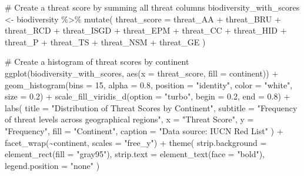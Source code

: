 \documentclass[
  letterpaper,
]{book}
\newenvironment{Shaded}{\begin{snugshade}}{\end{snugshade}}
\newcommand{\AttributeTok}[1]{\textcolor[rgb]{0.40,0.45,0.13}{#1}}
\newcommand{\CommentTok}[1]{\textcolor[rgb]{0.37,0.37,0.37}{#1}}
\newcommand{\DecValTok}[1]{\textcolor[rgb]{0.68,0.00,0.00}{#1}}
\newcommand{\FloatTok}[1]{\textcolor[rgb]{0.68,0.00,0.00}{#1}}
\newcommand{\FunctionTok}[1]{\textcolor[rgb]{0.28,0.35,0.67}{#1}}
\newcommand{\NormalTok}[1]{\textcolor[rgb]{0.00,0.23,0.31}{#1}}
\newcommand{\OtherTok}[1]{\textcolor[rgb]{0.00,0.23,0.31}{#1}}
\newcommand{\SpecialCharTok}[1]{\textcolor[rgb]{0.37,0.37,0.37}{#1}}
\newcommand{\StringTok}[1]{\textcolor[rgb]{0.13,0.47,0.30}{#1}}
\begin{document}
\begin{Shaded}
\begin{Highlighting}[]
\CommentTok{\# Create a threat score by summing all threat columns}
\NormalTok{biodiversity\_with\_scores }\OtherTok{\textless{}{-}}\NormalTok{ biodiversity }\SpecialCharTok{\%\textgreater{}\%}
  \FunctionTok{mutate}\NormalTok{(}
    \AttributeTok{threat\_score =}\NormalTok{ threat\_AA }\SpecialCharTok{+}\NormalTok{ threat\_BRU }\SpecialCharTok{+}\NormalTok{ threat\_RCD }\SpecialCharTok{+} 
\NormalTok{                  threat\_ISGD }\SpecialCharTok{+}\NormalTok{ threat\_EPM }\SpecialCharTok{+}\NormalTok{ threat\_CC }\SpecialCharTok{+} 
\NormalTok{                  threat\_HID }\SpecialCharTok{+}\NormalTok{ threat\_P }\SpecialCharTok{+}\NormalTok{ threat\_TS }\SpecialCharTok{+} 
\NormalTok{                  threat\_NSM }\SpecialCharTok{+}\NormalTok{ threat\_GE}
\NormalTok{  )}

\CommentTok{\# Create a histogram of threat scores by continent}
\FunctionTok{ggplot}\NormalTok{(biodiversity\_with\_scores, }\FunctionTok{aes}\NormalTok{(}\AttributeTok{x =}\NormalTok{ threat\_score, }\AttributeTok{fill =}\NormalTok{ continent)) }\SpecialCharTok{+}
  \FunctionTok{geom\_histogram}\NormalTok{(}\AttributeTok{bins =} \DecValTok{15}\NormalTok{, }\AttributeTok{alpha =} \FloatTok{0.8}\NormalTok{, }\AttributeTok{position =} \StringTok{"identity"}\NormalTok{, }\AttributeTok{color =} \StringTok{"white"}\NormalTok{, }\AttributeTok{size =} \FloatTok{0.2}\NormalTok{) }\SpecialCharTok{+}
  \FunctionTok{scale\_fill\_viridis\_d}\NormalTok{(}\AttributeTok{option =} \StringTok{"turbo"}\NormalTok{, }\AttributeTok{begin =} \FloatTok{0.2}\NormalTok{, }\AttributeTok{end =} \FloatTok{0.8}\NormalTok{) }\SpecialCharTok{+}
  \FunctionTok{labs}\NormalTok{(}
    \AttributeTok{title =} \StringTok{"Distribution of Threat Scores by Continent"}\NormalTok{,}
    \AttributeTok{subtitle =} \StringTok{"Frequency of threat levels across geographical regions"}\NormalTok{,}
    \AttributeTok{x =} \StringTok{"Threat Score"}\NormalTok{,}
    \AttributeTok{y =} \StringTok{"Frequency"}\NormalTok{,}
    \AttributeTok{fill =} \StringTok{"Continent"}\NormalTok{,}
    \AttributeTok{caption =} \StringTok{"Data source: IUCN Red List"}
\NormalTok{  ) }\SpecialCharTok{+}
  \FunctionTok{facet\_wrap}\NormalTok{(}\SpecialCharTok{\textasciitilde{}}\NormalTok{continent, }\AttributeTok{scales =} \StringTok{"free\_y"}\NormalTok{) }\SpecialCharTok{+}
  \FunctionTok{theme}\NormalTok{(}
    \AttributeTok{strip.background =} \FunctionTok{element\_rect}\NormalTok{(}\AttributeTok{fill =} \StringTok{"gray95"}\NormalTok{),}
    \AttributeTok{strip.text =} \FunctionTok{element\_text}\NormalTok{(}\AttributeTok{face =} \StringTok{"bold"}\NormalTok{),}
    \AttributeTok{legend.position =} \StringTok{"none"}
\NormalTok{  )}
\end{Highlighting}
\end{Shaded}
\end{document}
